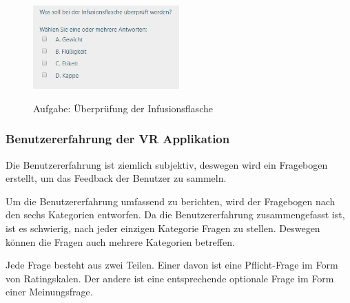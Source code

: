 \begin{enumerate}
\begin{figure}[ht]
\vspace*{1em}
\centering
\caption{Aufgabe: Überprüfung der Infusionsflasche}
\includegraphics[width= 0.5\textwidth]{images/Aufgabe5.png}
\label{fig:Aufgabe5} 
\end{figure}
    
\end{enumerate}

\subsubsection{Benutzererfahrung der VR Applikation}

Die Benutzererfahrung ist ziemlich subjektiv, deswegen wird ein Fragebogen erstellt, um das Feedback der Benutzer zu sammeln.

Um die Benutzererfahrung umfassend zu berichten, wird der Fragebogen nach den sechs Kategorien \citep{28} entworfen. Da die Benutzererfahrung zusammengefasst ist, ist es schwierig, nach jeder einzigen Kategorie Fragen zu stellen. Deswegen können die Fragen auch mehrere Kategorien betreffen.

Jede Frage besteht aus zwei Teilen. Einer davon ist eine Pflicht-Frage im Form von Ratingskalen. Der andere ist eine entsprechende optionale Frage im Form einer Meinungsfrage.

